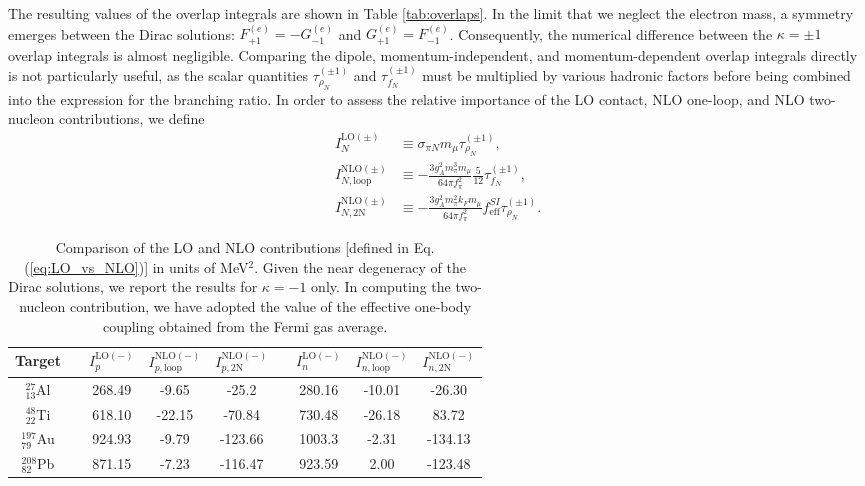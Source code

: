 \documentclass[12pt,letterpaper]{book}
\begin{document}
The resulting values of the overlap integrals are shown in Table \ref{tab:overlaps}. In the limit that we neglect the electron mass, a symmetry emerges between the Dirac solutions: $F_{+1}^{(e)}=-G_{-1}^{(e)}$ and $G_{+1}^{(e)}=F_{-1}^{(e)}$. Consequently, the numerical difference between the $\kappa=\pm 1$ overlap integrals is almost negligible. Comparing the dipole, momentum-independent, and momentum-dependent overlap integrals directly is not particularly useful, as the scalar quantities $\tau^{(\pm 1)}_{\rho_N}$ and $\tau^{(\pm 1)}_{f_N}$ must be multiplied by various hadronic factors before being combined into the expression for the branching ratio. In order to assess the relative importance of the LO contact, NLO one-loop, and NLO two-nucleon contributions, we define
\begin{equation}
\begin{split}
I_{N}^{\mathrm{LO}(\pm)}&\equiv \sigma_{\pi N}m_{\mu}\tau^{(\pm 1)}_{\rho_N},\\
I_{N,\mathrm{loop}}^{\mathrm{NLO}(\pm)}&\equiv -\frac{3g_A^2m_{\pi}^3m_{\mu}}{64\pi f_{\pi}^2}\frac{5}{12}\tau^{(\pm 1)}_{f_N},\\
I^{\mathrm{NLO}(\pm)}_{N,\mathrm{2N}}&\equiv -\frac{3g_A^2m_{\pi}^2k_Fm_{\mu}}{64\pi f_{\pi}^2}f^{SI}_\mathrm{eff}\tau^{(\pm 1)}_{\rho_N}.
\end{split}
\label{eq:LO_vs_NLO}
\end{equation}
\begin{table}
\centering
{\renewcommand{\arraystretch}{1.5}
\begin{tabular}{ccccccccc}
\hline
\hline
Target & & $I_{p}^{\mathrm{LO}(-)}$ & $I_{p,\mathrm{loop}}^{\mathrm{NLO}(-)}$ & $I^{\mathrm{NLO}(-)}_{p,\mathrm{2N}}$ & & $I_{n}^{\mathrm{LO}(-)}$ &  $I_{n,\mathrm{loop}}^{\mathrm{NLO}(-)}$ & $I^{\mathrm{NLO}(-)}_{n,\mathrm{2N}}$\\
\hline
$^{27}_{13}$Al & & 268.49 & -9.65 & -25.2 & & 280.16 & -10.01 & -26.30\\
$^{48}_{22}$Ti & & 618.10 & -22.15 & -70.84 & & 730.48 & -26.18 & 83.72\\
$^{197}_{79}$Au & & 924.93 & -9.79 & -123.66 & & 1003.3 & -2.31 & -134.13 \\
$^{208}_{82}$Pb & & 871.15 & -7.23 & -116.47 & & 923.59 & 2.00 & -123.48\\ 
\hline
\hline
\end{tabular}
}
\caption{Comparison of the LO and NLO contributions [defined in Eq. (\ref{eq:LO_vs_NLO})] in units of MeV$^2$. Given the near degeneracy of the Dirac solutions, we report the results for $\kappa=-1$ only. In computing the two-nucleon contribution, we have adopted the value of the effective one-body coupling obtained from the Fermi gas average.}
\label{tab:LO_vs_NLO}
\end{table}
\end{document}
